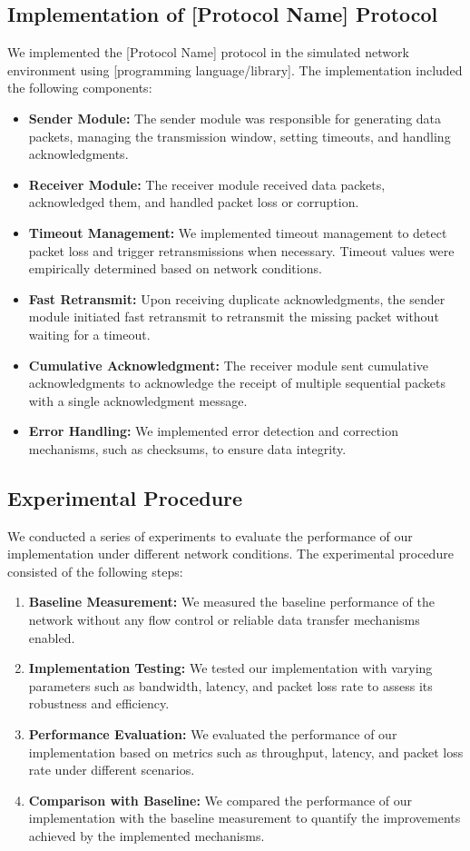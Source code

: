 \documentclass[11pt]{article}
\begin{document}
\subsection{Implementation of [Protocol Name] Protocol}
We implemented the [Protocol Name] protocol in the simulated network environment using [programming language/library]. The implementation included the following components:

\begin{itemize}
    \item \textbf{Sender Module:} The sender module was responsible for generating data packets, managing the transmission window, setting timeouts, and handling acknowledgments.
    \item \textbf{Receiver Module:} The receiver module received data packets, acknowledged them, and handled packet loss or corruption.
    \item \textbf{Timeout Management:} We implemented timeout management to detect packet loss and trigger retransmissions when necessary. Timeout values were empirically determined based on network conditions.
    \item \textbf{Fast Retransmit:} Upon receiving duplicate acknowledgments, the sender module initiated fast retransmit to retransmit the missing packet without waiting for a timeout.
    \item \textbf{Cumulative Acknowledgment:} The receiver module sent cumulative acknowledgments to acknowledge the receipt of multiple sequential packets with a single acknowledgment message.
    \item \textbf{Error Handling:} We implemented error detection and correction mechanisms, such as checksums, to ensure data integrity.
\end{itemize}

\subsection{Experimental Procedure}
We conducted a series of experiments to evaluate the performance of our implementation under different network conditions. The experimental procedure consisted of the following steps:

\begin{enumerate}
    \item \textbf{Baseline Measurement:} We measured the baseline performance of the network without any flow control or reliable data transfer mechanisms enabled.
    \item \textbf{Implementation Testing:} We tested our implementation with varying parameters such as bandwidth, latency, and packet loss rate to assess its robustness and efficiency.
    \item \textbf{Performance Evaluation:} We evaluated the performance of our implementation based on metrics such as throughput, latency, and packet loss rate under different scenarios.
    \item \textbf{Comparison with Baseline:} We compared the performance of our implementation with the baseline measurement to quantify the improvements achieved by the implemented mechanisms.
\end{enumerate}
\end{document}
